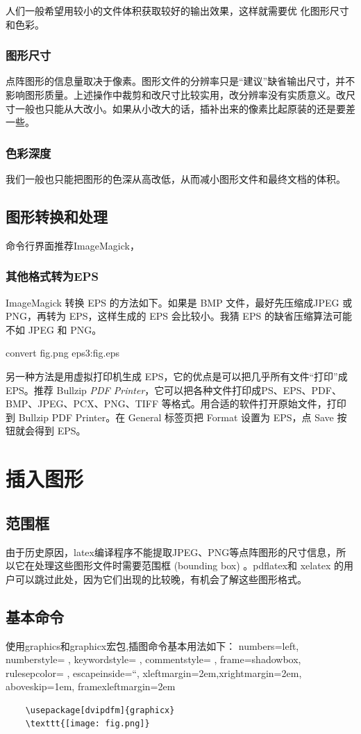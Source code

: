 \documentclass[UTF8]{article}
\begin{document}
人们一般希望用较小的文件体积获取较好的输出效果，这样就需要优
化图形尺寸和色彩。

\subsubsection{图形尺寸}
点阵图形的信息量取决于像素。图形文件的分辨率只是“建议”缺省输出尺寸，并不影响图形质量。上述操作中裁剪和改尺寸比较实用，改分辨率没有实质意义。改尺寸一般也只能从大改小。如果从小改大的话，插补出来的像素比起原装的还是要差一些。

\subsubsection{色彩深度}
我们一般也只能把图形的色深从高改低，从而减小图形文件和最终文档的体积。

\subsection{图形转换和处理}
命令行界面推荐ImageMagick，
\subsubsection{其他格式转为EPS}
ImageMagick 转换 EPS 的方法如下。如果是 BMP 文件，最好先压缩成JPEG 或 PNG，再转为 EPS，这样生成的 EPS 会比较小。我猜 EPS 的缺省压缩算法可能不如 JPEG 和 PNG。

convert fig.png eps3:fig.eps

另一种方法是用虚拟打印机生成 EPS，它的优点是可以把几乎所有文件“打印”成 EPS。推荐 Bullzip \emph{PDF Printer}，它可以把各种文件打印成PS、EPS、PDF、BMP、JPEG、PCX、PNG、TIFF 等格式。用合适的软件打开原始文件，打印到 Bullzip PDF Printer。在 General 标签页把 Format 设置为 EPS，点 Save 按钮就会得到 EPS。

\section{插入图形}
\subsection{范围框}
由于历史原因，latex编译程序不能提取JPEG、PNG等点阵图形的尺寸信息，所以它在处理这些图形文件时需要范围框 (bounding box) 。pdflatex和 xelatex 的用户可以跳过此处，因为它们出现的比较晚，有机会了解这些图形格式。

\subsection{基本命令}
使用graphics和graphicx宏包,插图命令基本用法如下：
\lstset
{
numbers=left, 
numberstyle= \tiny, 
keywordstyle= \color{ blue!70},
commentstyle= \color{red!50!green!50!blue!50}, 
frame=shadowbox, %
rulesepcolor= \color{ red!20!green!20!blue!20} ,
escapeinside=``, %
xleftmargin=2em,xrightmargin=2em, aboveskip=1em,
framexleftmargin=2em
}
\begin{lstlisting}
	\usepackage[dvipdfm]{graphicx}
	\texttt{[image: fig.png]}
\end{lstlisting}
\end{document}
